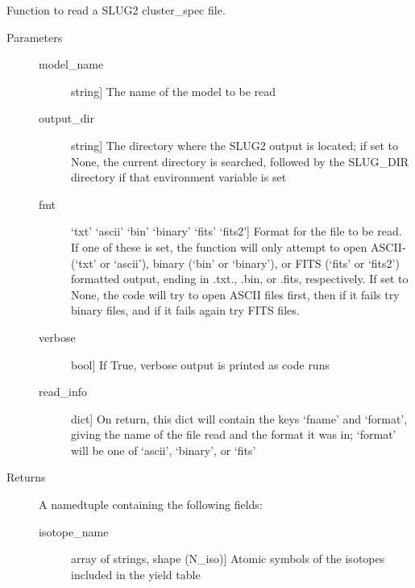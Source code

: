 \documentclass[letterpaper,10pt,english]{sphinxmanual}
\begin{document}

\begin{fulllineitems}
\label{slugpy:slugpy.read_cluster_yield}
Function to read a SLUG2 cluster\_spec file.
\begin{description}
\item[{Parameters}] \leavevmode\begin{description}
\item[{model\_name}] \leavevmode{[}string{]}
The name of the model to be read

\item[{output\_dir}] \leavevmode{[}string{]}
The directory where the SLUG2 output is located; if set to None,
the current directory is searched, followed by the SLUG\_DIR
directory if that environment variable is set

\item[{fmt}] \leavevmode{[}`txt' \textbar{} `ascii' \textbar{} `bin' \textbar{} `binary' \textbar{} `fits' \textbar{} `fits2'{]}
Format for the file to be read. If one of these is set, the
function will only attempt to open ASCII-(`txt' or `ascii'), 
binary (`bin' or `binary'), or FITS (`fits' or `fits2')
formatted output, ending in .txt., .bin, or .fits,
respectively. If set to None, the code will try to open
ASCII files first, then if it fails try binary files, and if
it fails again try FITS files.

\item[{verbose}] \leavevmode{[}bool{]}
If True, verbose output is printed as code runs

\item[{read\_info}] \leavevmode{[}dict{]}
On return, this dict will contain the keys `fname' and
`format', giving the name of the file read and the format it
was in; `format' will be one of `ascii', `binary', or `fits'

\end{description}

\item[{Returns}] \leavevmode
A namedtuple containing the following fields:
\begin{description}
\item[{isotope\_name}] \leavevmode{[}array of strings, shape (N\_iso){]}
Atomic symbols of the isotopes included in the yield table


\end{description}
\end{description}
\end{fulllineitems}
\end{document}
